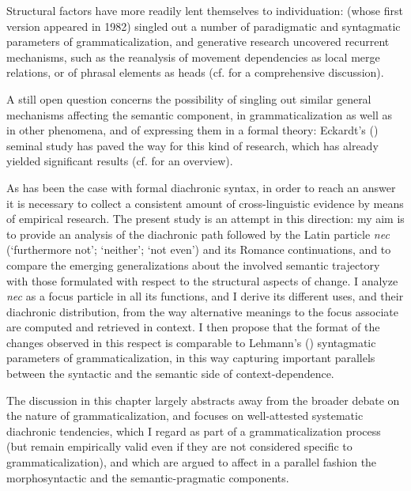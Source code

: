 \documentclass[output=paper,modfonts,nonflat,citecolor=brown,
showindex
]{langsci/langscibook}
\begin{document}
Structural factors have more readily lent themselves to individuation: \linebreak \citet[]{Lehmann15} (whose first version appeared in 1982) singled out a number of paradigmatic and syntagmatic parameters of grammaticalization, and \linebreak generative research uncovered recurrent mechanisms, such as the reanalysis of movement dependencies as local merge relations, or of phrasal elements as heads (cf. \citealt[]{RobertsRoussou03, Gelderen04a} for a comprehensive discussion). 

A still open question concerns the possibility of singling out similar general mechanisms affecting the semantic component, in grammaticalization as well as in other phenomena, and of expressing them in a formal theory: Eckardt's (\citeyear{Eckardt06}) seminal study has paved the way for this kind of research, which has already yielded significant results (cf. \citealt[]{Eckardt12, Deo15, Gianolloetal15} for an overview). 

As has been the case with formal diachronic syntax, in order to reach an answer it is necessary to collect a consistent amount of cross-linguistic evidence by means of empirical research. The present study is an attempt in this direction: my aim is to provide an analysis of the diachronic path followed by the Latin particle {\emph{nec}} (`furthermore not'; `neither'; `not even') and its Romance continuations, and to compare the emerging generalizations about the involved semantic trajectory with those formulated with respect to the structural aspects of change. I analyze {\emph{nec}} as a focus particle in all its functions, and I derive its different uses, and their diachronic distribution, from the way alternative meanings to the focus associate are computed and retrieved in context. I then propose that the format of the changes observed in this respect is comparable to Lehmann's (\citeyear[]{Lehmann15}) syntagmatic parameters of grammaticalization, in this way capturing important parallels between the syntactic and the semantic side of context-dependence.  

The discussion in this chapter largely abstracts away from the broader debate on the nature of grammaticalization, and focuses on well-attested systematic diachronic tendencies, which I regard as part of a grammaticalization process (but remain empirically valid even if they are not considered specific to grammaticalization), and which are argued to affect in a parallel fashion the morphosyntactic and the semantic-pragmatic components.
\end{document}
